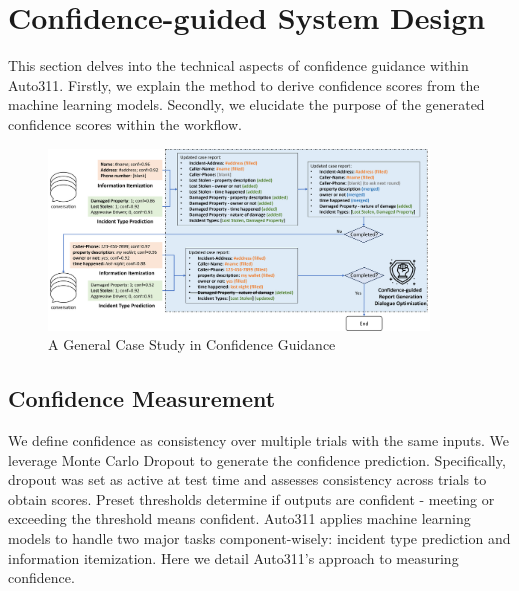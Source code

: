 \section{Confidence-guided System Design}

This section delves into the technical aspects of confidence guidance within Auto311. Firstly, we explain the method to derive confidence scores from the machine learning models. Secondly, we elucidate the purpose of the generated confidence scores within the workflow.


\begin{figure}[t]
    \centering
    \includegraphics[width=0.9\textwidth]{figures/case_study.png}
    \caption{A General Case Study in Confidence Guidance}
    \label{fig:case_study}
    \vspace{-0.5cm}
\end{figure}

\subsection{Confidence Measurement}

We define confidence as consistency over multiple trials with the same inputs. We leverage Monte Carlo Dropout\cite{gal2016dropout, ma2021predictive} to generate the confidence prediction. Specifically, dropout was set as active at test time and assesses consistency across trials to obtain scores. Preset thresholds determine if outputs are confident - meeting or exceeding the threshold means confident. Auto311 applies machine learning models to handle two major tasks component-wisely: incident type prediction and information itemization. Here we detail Auto311's approach to measuring confidence.

